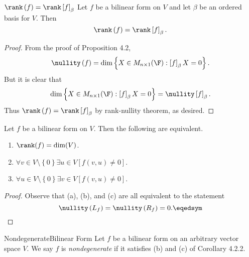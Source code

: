 \documentclass[linearalgebraII]{subfiles}
\begin{document}
    \begin{cor}{$\rank\left( f \right) =\rank\left[ f \right] _\beta$}
        Let $f$ be a bilinear form on $V$ and let $\beta$ be an ordered basis for $V$. Then
        \begin{equation*}
            \rank\left( f \right) = \rank\left[ f \right] _\beta.
        \end{equation*}
    \end{cor}	

    \begin{proof}
        From the proof of Proposition 4.2,
        \begin{equation*}
            \nullity\left( f \right) = \dim\left\lbrace X\in M_{n\times 1}(\F) : \left[ f \right] _\beta X = 0 \right\rbrace .
        \end{equation*}
        But it is clear that
        \begin{equation*}
            \dim\left\lbrace X\in M_{n\times 1}(\F) : \left[ f \right] _\beta X = 0 \right\rbrace = \nullity\left[ f \right] _\beta.
        \end{equation*}
        Thus $\rank\left( f \right) = \rank\left[ f \right] _\beta$ by rank-nullity theorem, as desired.
    \end{proof}

    \clearpage
    \begin{cor}{}
        Let $f$ be a bilinear form on $V$. Then the following are equivalent.
        \begin{enumerate}
            \item $\rank(f) = \dim(V)$.
            \item $\forall v\in V\setminus \left\lbrace 0 \right\rbrace\exists u\in V \left[ f\left( v,u \right) \neq 0 \right]$.
            \item $\forall u\in V\setminus \left\lbrace 0 \right\rbrace\exists v\in V \left[ f\left( v,u \right) \neq 0 \right]$.
        \end{enumerate}
    \end{cor}	

    \begin{proof}
        Observe that (a), (b), and (c) are all equivalent to the statement
        \begin{equation*}
            \nullity\left( L_f \right) = \nullity\left( R_f \right) = 0. \eqedsym
        \end{equation*}
    \end{proof}

    \begin{definition}{Nondegenerate}{Bilinear Form}
        Let $f$ be a bilinear form on an arbitrary vector space $V$. We say $f$ is \emph{nondegenerate} if it satisfies (b) and (c) of Corollary 4.2.2.
    \end{definition}
\end{document}
